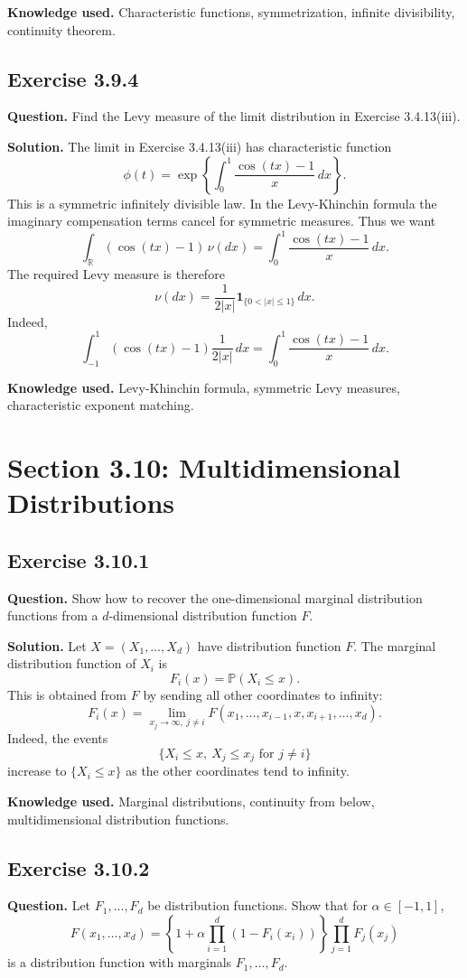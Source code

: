 \documentclass[11pt]{article}
\newcommand{\Prob}{\mathbb{P}}
\begin{document}
\textbf{Knowledge used.}
Characteristic functions, symmetrization, infinite divisibility,
continuity theorem.

\subsection*{Exercise 3.9.4}
\textbf{Question.}
Find the Levy measure of the limit distribution in Exercise 3.4.13(iii).

\textbf{Solution.}
The limit in Exercise 3.4.13(iii) has characteristic function
\[
  \phi(t)=
  \exp\left\{
    \int_0^1 \frac{\cos(tx)-1}{x}\,dx
  \right\}.
\]
This is a symmetric infinitely divisible law.  In the Levy-Khinchin
formula the imaginary compensation terms cancel for symmetric measures.
Thus we want
\[
  \int_{\mathbb R}(\cos(tx)-1)\,\nu(dx)
  =
  \int_0^1 \frac{\cos(tx)-1}{x}\,dx.
\]
The required Levy measure is therefore
\[
  \nu(dx)
  =
  \frac{1}{2|x|}\mathbf{1}_{\{0<|x|\le1\}}\,dx.
\]
Indeed,
\[
  \int_{-1}^1(\cos(tx)-1)\frac{1}{2|x|}\,dx
  =
  \int_0^1\frac{\cos(tx)-1}{x}\,dx.
\]

\textbf{Knowledge used.}
Levy-Khinchin formula, symmetric Levy measures, characteristic exponent
matching.

\section*{Section 3.10: Multidimensional Distributions}

\subsection*{Exercise 3.10.1}
\textbf{Question.}
Show how to recover the one-dimensional marginal distribution functions
from a $d$-dimensional distribution function $F$.

\textbf{Solution.}
Let $X=(X_1,\ldots,X_d)$ have distribution function $F$.  The marginal
distribution function of $X_i$ is
\[
  F_i(x)
  =
  \Prob(X_i\le x).
\]
This is obtained from $F$ by sending all other coordinates to infinity:
\[
  F_i(x)
  =
  \lim_{x_j\to\infty,\ j\ne i}
  F(x_1,\ldots,x_{i-1},x,x_{i+1},\ldots,x_d).
\]
Indeed, the events
\[
  \{X_i\le x,\ X_j\le x_j\text{ for }j\ne i\}
\]
increase to $\{X_i\le x\}$ as the other coordinates tend to infinity.

\textbf{Knowledge used.}
Marginal distributions, continuity from below, multidimensional
distribution functions.

\subsection*{Exercise 3.10.2}
\textbf{Question.}
Let $F_1,\ldots,F_d$ be distribution functions.  Show that for
$\alpha\in[-1,1]$,
\[
  F(x_1,\ldots,x_d)
  =
  \left\{
    1+\alpha\prod_{i=1}^d(1-F_i(x_i))
  \right\}
  \prod_{j=1}^d F_j(x_j)
\]
is a distribution function with marginals $F_1,\ldots,F_d$.
\end{document}
